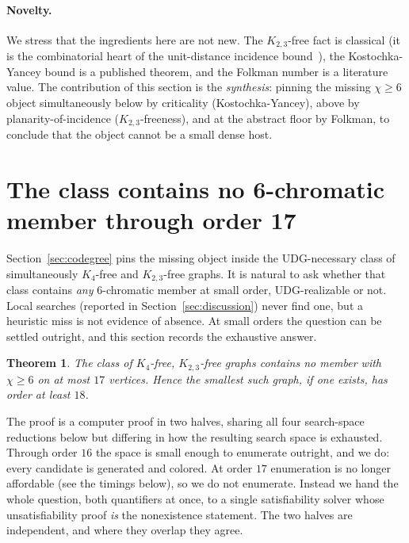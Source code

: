 \documentclass[11pt]{article}
\newtheorem{theorem}{Theorem}
\theoremstyle{definition}
\newcommand{\chrom}{\chi}
\begin{document}
\paragraph{Novelty.} We stress that the ingredients here are not new. The
$K_{2,3}$-free fact is classical (it is the combinatorial heart of the unit-distance
incidence bound~\cite{SpencerSzemerediTrotter1984}), the Kostochka-Yancey bound
is a published theorem, and the Folkman number is a literature value. The
contribution of this section is the \emph{synthesis}: pinning the missing
$\chrom \ge 6$ object simultaneously below by criticality (Kostochka-Yancey),
above by planarity-of-incidence ($K_{2,3}$-freeness), and at the abstract floor
by Folkman, to conclude that the object cannot be a small dense host.

\section{The class contains no 6-chromatic member through order 17}
\label{sec:exhaustive}

Section~\ref{sec:codegree} pins the missing object inside the UDG-necessary
class of simultaneously $K_4$-free and $K_{2,3}$-free graphs. It is natural to
ask whether that class contains \emph{any} $6$-chromatic member at small order,
UDG-realizable or not. Local searches (reported in
Section~\ref{sec:discussion}) never find one, but a heuristic miss is not
evidence of absence. At small orders the question can be settled outright, and
this section records the exhaustive answer.

\begin{theorem}
\label{thm:exhaustive}
The class of $K_4$-free, $K_{2,3}$-free graphs contains no member with
$\chrom \ge 6$ on at most $17$ vertices. Hence the smallest such graph, if one
exists, has order at least $18$.
\end{theorem}

The proof is a computer proof in two halves, sharing all four search-space
reductions below but differing in how the resulting search space is exhausted.
Through order $16$ the space is small enough to enumerate outright, and we do:
every candidate is generated and colored. At order $17$ enumeration is no longer
affordable (see the timings below), so we do not enumerate. Instead we hand the
whole question, both quantifiers at once, to a single satisfiability solver whose
unsatisfiability proof \emph{is} the nonexistence statement. The two halves are
independent, and where they overlap they agree.
\end{document}
